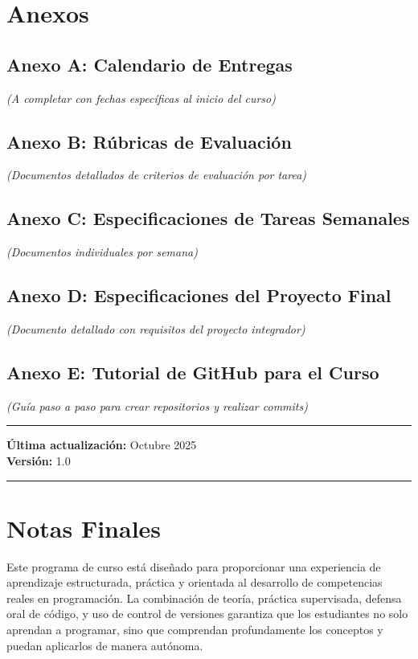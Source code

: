 \documentclass[12pt,letterpaper]{article}
\begin{document}
\section{Anexos}

\subsection{Anexo A: Calendario de Entregas}
\textit{(A completar con fechas específicas al inicio del curso)}

\subsection{Anexo B: Rúbricas de Evaluación}
\textit{(Documentos detallados de criterios de evaluación por tarea)}

\subsection{Anexo C: Especificaciones de Tareas Semanales}
\textit{(Documentos individuales por semana)}

\subsection{Anexo D: Especificaciones del Proyecto Final}
\textit{(Documento detallado con requisitos del proyecto integrador)}

\subsection{Anexo E: Tutorial de GitHub para el Curso}
\textit{(Guía paso a paso para crear repositorios y realizar commits)}

\vspace{2cm}

\begin{center}
\hrule
\vspace{0.5cm}
\textbf{Última actualización:} Octubre 2025\\
\textbf{Versión:} 1.0
\vspace{0.5cm}
\hrule
\end{center}

\newpage

\section*{Notas Finales}

Este programa de curso está diseñado para proporcionar una experiencia de aprendizaje estructurada, práctica y orientada al desarrollo de competencias reales en programación. La combinación de teoría, práctica supervisada, defensa oral de código, y uso de control de versiones garantiza que los estudiantes no solo aprendan a programar, sino que comprendan profundamente los conceptos y puedan aplicarlos de manera autónoma.
\end{document}
